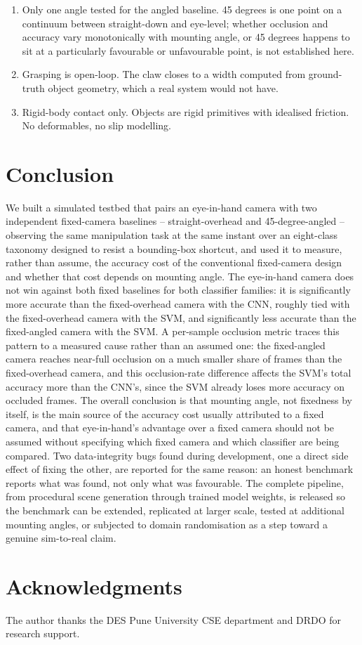 \documentclass[conference]{IEEEtran}
\begin{document}
\begin{enumerate}
  \item Only one angle tested for the angled baseline. 45 degrees is one point on a continuum between straight-down and eye-level; whether occlusion and accuracy vary monotonically with mounting angle, or 45 degrees happens to sit at a particularly favourable or unfavourable point, is not established here.

  \item Grasping is open-loop. The claw closes to a width computed from ground-truth object geometry, which a real system would not have.

  \item Rigid-body contact only. Objects are rigid primitives with idealised friction. No deformables, no slip modelling.

\end{enumerate}

\section{Conclusion}

We built a simulated testbed that pairs an eye-in-hand camera with two independent fixed-camera baselines -- straight-overhead and 45-degree-angled -- observing the same manipulation task at the same instant over an eight-class taxonomy designed to resist a bounding-box shortcut, and used it to measure, rather than assume, the accuracy cost of the conventional fixed-camera design and whether that cost depends on mounting angle. The eye-in-hand camera does not win against both fixed baselines for both classifier families: it is significantly more accurate than the fixed-overhead camera with the CNN, roughly tied with the fixed-overhead camera with the SVM, and significantly less accurate than the fixed-angled camera with the SVM. A per-sample occlusion metric traces this pattern to a measured cause rather than an assumed one: the fixed-angled camera reaches near-full occlusion on a much smaller share of frames than the fixed-overhead camera, and this occlusion-rate difference affects the SVM's total accuracy more than the CNN's, since the SVM already loses more accuracy on occluded frames. The overall conclusion is that mounting angle, not fixedness by itself, is the main source of the accuracy cost usually attributed to a fixed camera, and that eye-in-hand's advantage over a fixed camera should not be assumed without specifying which fixed camera and which classifier are being compared. Two data-integrity bugs found during development, one a direct side effect of fixing the other, are reported for the same reason: an honest benchmark reports what was found, not only what was favourable. The complete pipeline, from procedural scene generation through trained model weights, is released so the benchmark can be extended, replicated at larger scale, tested at additional mounting angles, or subjected to domain randomisation as a step toward a genuine sim-to-real claim.

\section*{Acknowledgments}

The author thanks the DES Pune University CSE department and DRDO for research support.




\end{document}
